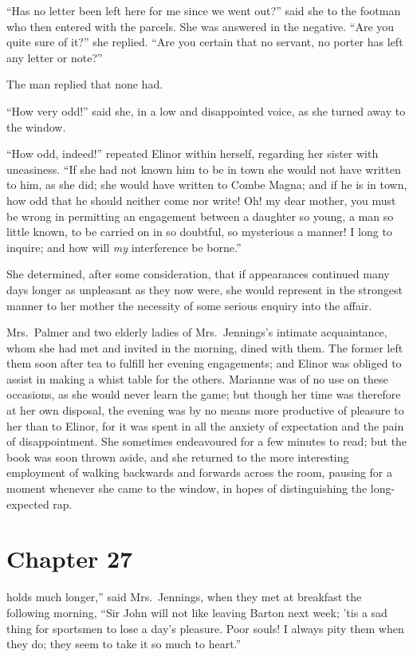 ``Has no letter been left here for me since we went out?''
said she to the footman who then entered with the parcels.
She was answered in the negative.  ``Are you quite sure
of it?'' she replied.  ``Are you certain that no servant,
no porter has left any letter or note?''

The man replied that none had.

``How very odd!'' said she, in a low and disappointed
voice, as she turned away to the window.

``How odd, indeed!'' repeated Elinor within herself,
regarding her sister with uneasiness.  ``If she had not
known him to be in town she would not have written to him,
as she did; she would have written to Combe Magna;
and if he is in town, how odd that he should neither
come nor write!  Oh! my dear mother, you must be wrong
in permitting an engagement between a daughter so young,
a man so little known, to be carried on in so doubtful,
so mysterious a manner!  I long to inquire; and how will \emph{my}
interference be borne.''

She determined, after some consideration, that if
appearances continued many days longer as unpleasant as they
now were, she would represent in the strongest manner
to her mother the necessity of some serious enquiry into the
affair.

Mrs.\ Palmer and two elderly ladies of Mrs.\ Jennings's
intimate acquaintance, whom she had met and invited
in the morning, dined with them.  The former left them
soon after tea to fulfill her evening engagements;
and Elinor was obliged to assist in making a whist table
for the others.  Marianne was of no use on these occasions,
as she would never learn the game; but though her time
was therefore at her own disposal, the evening was by no
means more productive of pleasure to her than to Elinor,
for it was spent in all the anxiety of expectation and the
pain of disappointment.  She sometimes endeavoured for a
few minutes to read; but the book was soon thrown aside,
and she returned to the more interesting employment
of walking backwards and forwards across the room,
pausing for a moment whenever she came to the window,
in hopes of distinguishing the long-expected rap.



\chapter{Chapter 27}


 holds much longer,'' said Mrs.\ Jennings,
when they met at breakfast the following morning,
``Sir John will not like leaving Barton next week;
'tis a sad thing for sportsmen to lose a day's pleasure.
Poor souls!  I always pity them when they do; they seem
to take it so much to heart.''

